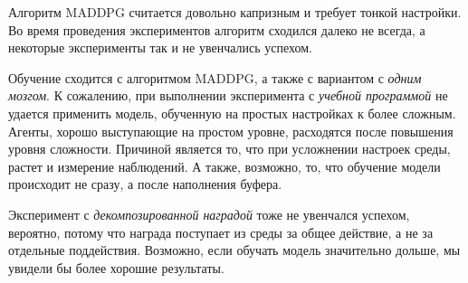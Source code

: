 Алгоритм MADDPG считается довольно капризным и требует тонкой настройки. Во время проведения экспериментов алгоритм сходился далеко не всегда, а некоторые эксперименты так и не увенчались успехом.

Обучение сходится с алгоритмом MADDPG, а также с вариантом с \textit{одним мозгом}. К сожалению, при выполнении эксперимента с \textit{учебной программой} не удается применить модель, обученную на простых настройках к более сложным. Агенты, хорошо выступающие на простом уровне, расходятся после повышения уровня сложности. Причиной является то, что при усложнении настроек среды, растет и измерение наблюдений. А также, возможно, то, что обучение модели происходит не сразу, а после наполнения буфера.

Эксперимент с \textit{декомпозированной наградой} тоже не увенчался успехом, вероятно, потому что награда поступает из среды за общее действие, а не за отдельные поддействия. Возможно, если обучать модель значительно дольше, мы увидели бы более хорошие результаты.


\newpage
